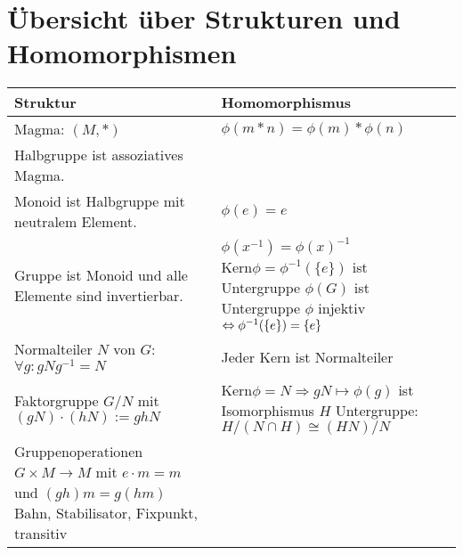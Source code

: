 \newpage
\section{Übersicht über Strukturen und Homomorphismen}
\begin{tabular}{p{}|p{}}
    Struktur &  Homomorphismus\\
    \hline\hline
    Magma: $(M,*)$
     & $\phi(m*n)=\phi(m)*\phi(n)$ \\
     \hline
    Halbgruppe ist assoziatives Magma. & \\
    \hline
    Monoid ist Halbgruppe mit neutralem Element. & 
     $\phi(e)=e$
     
    \\\hline
    Gruppe ist Monoid und alle Elemente sind invertierbar. &
     $\phi(x^{-1})=\phi(x)^{-1}$ \newline
     $\text{Kern}\phi=\phi^{-1}(\{e\})$ ist Untergruppe \newline
     $\phi(G)$ ist Untergruppe \newline
     $\phi$ injektiv $\Leftrightarrow \phi^{-1}(\{e\})=\{e\}$ \newline
    
    \\\hline
    Normalteiler $N$ von $G$: $\forall g: gNg^{-1}=N$ &
     Jeder Kern ist Normalteiler
    
    \\\hline
    Faktorgruppe $G/N$ mit $(gN)\cdot(hN):=ghN$ &
     $\text{Kern}\phi=N \Rightarrow gN \mapsto \phi(g)$ ist Isomorphismus \newline
     $H$ Untergruppe: $H/(N\cap H) \cong (HN)/N$
    
    \\\hline
    Gruppenoperationen $G\times M \to M$ mit $e\cdot m = m$ und $(gh)m = g(hm)$ \newline Bahn, Stabilisator, Fixpunkt, transitiv &
    

\end{tabular}
